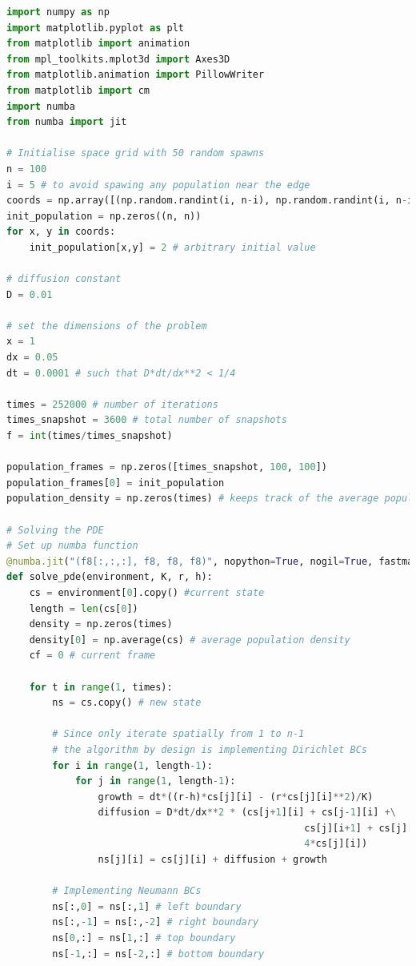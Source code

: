 \begin{lstlisting}[language=Python, caption=Code to simulate the hunting and diffusion model]
import numpy as np
import matplotlib.pyplot as plt
from matplotlib import animation
from mpl_toolkits.mplot3d import Axes3D
from matplotlib.animation import PillowWriter
from matplotlib import cm
import numba
from numba import jit

# Initialise space grid with 50 random spawns
n = 100
i = 5 # to avoid spawing any population near the edge 
coords = np.array([(np.random.randint(i, n-i), np.random.randint(i, n-i)) for _ in range (50)])
init_population = np.zeros((n, n))
for x, y in coords:
    init_population[x,y] = 2 # arbitrary initial value

# diffusion constant
D = 0.01

# set the dimensions of the problem
x = 1
dx = 0.05
dt = 0.0001 # such that D*dt/dx**2 < 1/4

times = 252000 # number of iterations
times_snapshot = 3600 # total number of snapshots
f = int(times/times_snapshot)

population_frames = np.zeros([times_snapshot, 100, 100])
population_frames[0] = init_population
population_density = np.zeros(times) # keeps track of the average population density

# Solving the PDE
# Set up numba function
@numba.jit("(f8[:,:,:], f8, f8, f8)", nopython=True, nogil=True, fastmath = True, parallel=True)
def solve_pde(environment, K, r, h):
    cs = environment[0].copy() #current state
    length = len(cs[0])
    density = np.zeros(times)
    density[0] = np.average(cs) # average population density
    cf = 0 # current frame

    for t in range(1, times):
        ns = cs.copy() # new state

        # Since only iterate spatially from 1 to n-1
        # the algorithm by design is implementing Dirichlet BCs
        for i in range(1, length-1):
            for j in range(1, length-1):
                growth = dt*((r-h)*cs[j][i] - (r*cs[j][i]**2)/K)
                diffusion = D*dt/dx**2 * (cs[j+1][i] + cs[j-1][i] +\
                                                    cs[j][i+1] + cs[j][i-1] -\
                                                    4*cs[j][i])
                ns[j][i] = cs[j][i] + diffusion + growth

        # Implementing Neumann BCs
        ns[:,0] = ns[:,1] # left boundary
        ns[:,-1] = ns[:,-2] # right boundary
        ns[0,:] = ns[1,:] # top boundary
        ns[-1,:] = ns[-2,:] # bottom boundary
        

\end{lstlisting}
